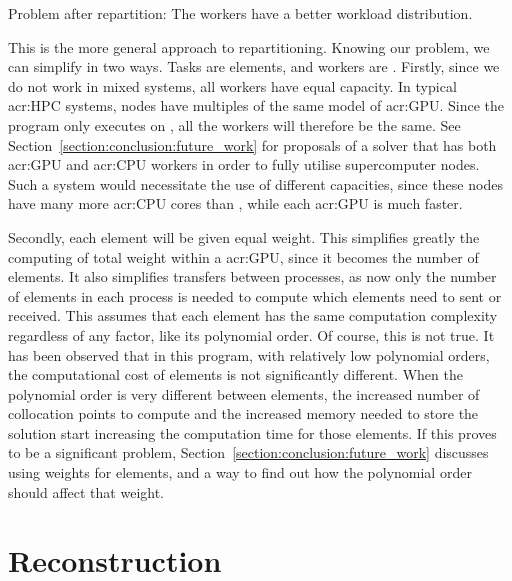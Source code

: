 \begin{table}[H]
\begin{center}
		\caption{Problem after repartition: The workers have a better workload distribution.}\label{table:after_repartition}
	\end{center}
\end{table}

This is the more general approach to repartitioning. Knowing our problem, we can simplify in two
ways. Tasks are elements, and workers are . Firstly, since we do not work in
mixed systems, all workers have equal capacity. In typical \acrshort{acr:HPC} systems, nodes have
multiples of the same model of \acrshort{acr:GPU}. Since the program only executes on
, all the workers will therefore be the same. See
Section~\ref{section:conclusion:future_work} for proposals of a solver that has both
\acrshort{acr:GPU} and \acrshort{acr:CPU} workers in order to fully utilise supercomputer nodes.
Such a system would necessitate the use of different capacities, since these nodes have many more
\acrshort{acr:CPU} cores than , while each \acrshort{acr:GPU} is much faster. 

Secondly, each element will be given equal weight. This simplifies greatly the computing of total
weight within a \acrshort{acr:GPU}, since it becomes the number of elements. It also simplifies
transfers between processes, as now only the number of elements in each process is needed to compute
which elements need to sent or received. This assumes that each element has the same computation
complexity regardless of any factor, like its polynomial order. Of course, this is not true. It has
been observed that in this program, with relatively low polynomial orders, the computational cost of
elements is not significantly different. When the polynomial order is very different between
elements, the increased number of collocation points to compute and the increased memory needed to
store the solution start increasing the computation time for those elements. If this proves to be a
significant problem, Section~\ref{section:conclusion:future_work} discusses using weights for
elements, and a way to find out how the polynomial order should affect that weight.

\section{Reconstruction}\label{section:load_balancing:reconstruction}

